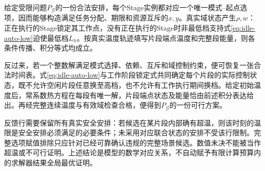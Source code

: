 给定受限问题$P_{\mathcal G}$的一份合法安排，每个Stage实例都对应一个唯一模式--起点选项，因而能够构造满足任务分配、期限和资源互斥的$x,y$。真实域状态产生$\rho,w$：正在执行的Stage锁定其工作点，没有正在执行的Stage时非最低档支持式\eqref{eq:idle-auto-low}迫使最低档$L_h$。按真实温度轨迹填写片段端点温度和完整段能量，则各条件传播、积分等式均成立。

反过来，若一个整数解满足模式选择、依赖、互斥和域控制约束，便可恢复一张合法时间表。式\eqref{eq:idle-auto-low}与工作阶段锁定式共同确定每个片段的实际控制状态，既不允许空闲片段任意换至高档，也不允许有工作执行期间换档。给定初始温度后，常系数热方程在每段有唯一解，片段端点状态及能量恰由前述积分表达给出。再经完整连续温度与有效域检查合格，便得到$P_{\mathcal G}$的一份可行方案。

反馈行需要保留所有真实安全安排：若候选在某片段内部确有超温，则该时刻的温限是安全安排必须满足的必要条件；未采用对应联合状态的安排不受该行限制。完整选项赋值排除只应针对已经可靠确认违规的完整场景候选。数值未决不能被当作超温或不可行证明。上述结论是模型的数学对应关系，不自动赋予有限计算预算内的求解器结果全局最优证明。

